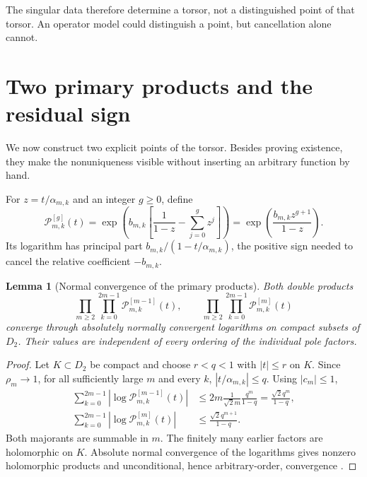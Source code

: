 \documentclass[11pt]{article}
\newtheorem{lemma}[theorem]{Lemma}
\newcommand{\PP}{\mathcal P}
\begin{document}
The singular data therefore determine a torsor, not a distinguished point of
that torsor.  An operator model could distinguish a point, but cancellation
alone cannot.

\section{Two primary products and the residual sign}

We now construct two explicit points of the torsor.  Besides proving
existence, they make the nonuniqueness visible without inserting an arbitrary
function by hand.

For \(z=t/\alpha_{m,k}\) and an integer \(g\ge0\), define
\begin{equation}\label{eq:primary}
 \PP_{m,k}^{[g]}(t)
 =\exp\!\left(
 b_{m,k}\left[\frac1{1-z}-\sum_{j=0}^{g}z^j\right]\right)
 =\exp\!\left(\frac{b_{m,k}z^{g+1}}{1-z}\right).
\end{equation}
Its logarithm has principal part
\(b_{m,k}/(1-t/\alpha_{m,k})\), the positive sign needed to cancel the
relative coefficient \(-b_{m,k}\).

\begin{lemma}[Normal convergence of the primary products]\label{lem:primary-normal}
Both double products
\begin{equation}\label{eq:two-products}
 \prod_{m\ge2}\prod_{k=0}^{2m-1}\PP_{m,k}^{[m-1]}(t),
 \qquad
 \prod_{m\ge2}\prod_{k=0}^{2m-1}\PP_{m,k}^{[m]}(t)
\end{equation}
converge through absolutely normally convergent logarithms on compact subsets
of \(D_2\).  Their values are independent of every ordering of the individual
pole factors.
\end{lemma}

\begin{proof}
Let \(K\subset D_2\) be compact and choose \(r<q<1\) with
\(|t|\le r\) on \(K\).  Since \(\rho_m\to1\), for all sufficiently large
\(m\) and every \(k\),
\(|t/\alpha_{m,k}|\le q\).  Using \(|c_m|\le1\),
\begin{align}
 \sum_{k=0}^{2m-1}|\log\PP_{m,k}^{[m-1]}(t)|
 &\le 2m\frac{1}{\sqrt2m}\frac{q^m}{1-q}
 =\frac{\sqrt2q^m}{1-q},\label{eq:majorant-minus}\\
 \sum_{k=0}^{2m-1}|\log\PP_{m,k}^{[m]}(t)|
 &\le\frac{\sqrt2q^{m+1}}{1-q}.
 \label{eq:majorant-plus}
\end{align}
Both majorants are summable in \(m\).  The finitely many earlier factors are
holomorphic on \(K\).  Absolute normal convergence of the logarithms gives
nonzero holomorphic products and unconditional, hence arbitrary-order,
convergence \cite{Remmert1991}.
\end{proof}
\end{document}
